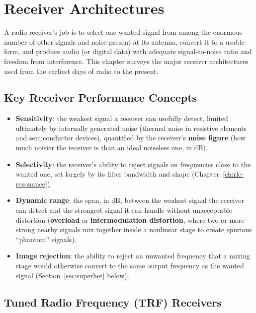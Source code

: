 \chapter{Receiver Architectures}
\label{ch:receivers}

A radio receiver's job is to select one wanted signal from among the
enormous number of other signals and noise present at its antenna,
convert it to a usable form, and produce audio (or digital data) with
adequate signal-to-noise ratio and freedom from interference. This
chapter surveys the major receiver architectures used from the earliest
days of radio to the present.

\section{Key Receiver Performance Concepts}

\begin{itemize}
\item \textbf{Sensitivity}: the weakest signal a receiver can usefully
detect, limited ultimately by internally generated noise (thermal noise
in resistive elements and semiconductor devices), quantified by the
receiver's \textbf{noise figure} (how much noisier the receiver is than
an ideal noiseless one, in dB).
\item \textbf{Selectivity}: the receiver's ability to reject signals on
frequencies close to the wanted one, set largely by its filter
bandwidth and shape (Chapter~\ref{ch:rlc-resonance}).
\item \textbf{Dynamic range}: the span, in dB, between the weakest
signal the receiver can detect and the strongest signal it can handle
without unacceptable distortion (\textbf{overload} or
\textbf{intermodulation distortion}, where two or more strong nearby
signals mix together inside a nonlinear stage to create spurious
``phantom'' signals).
\item \textbf{Image rejection}: the ability to reject an unwanted
frequency that a mixing stage would otherwise convert to the same output
frequency as the wanted signal (Section~\ref{sec:superhet} below).
\end{itemize}

\section{Tuned Radio Frequency (TRF) Receivers}


